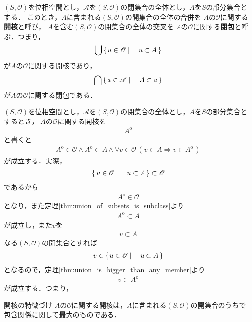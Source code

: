 	\begin{screen}
		\begin{dfn}[開核・閉包]
			$(S,\mathscr{O})$を位相空間とし，$\mathscr{A}$を$(S,\mathscr{O})$の閉集合の全体とし，$A$を$S$の部分集合とする．
			このとき，$A$に含まれる$(S,\mathscr{O})$の開集合の全体の合併を
			$A$の$\mathscr{O}$に関する{\bf 開核}と呼び，
			$A$を含む$(S,\mathscr{O})$の閉集合の全体の交叉を
			$A$の$\mathscr{O}$に関する{\bf 閉包}と呼ぶ．つまり，
			\begin{align}
				\bigcup \left\{\, u \in \mathscr{O} \mid \quad u \subset A\, \right\}
			\end{align}
			が$A$の$\mathscr{O}$に関する開核であり，
			\begin{align}
				\bigcap \left\{\, a \in \mathscr{A} \mid \quad A \subset a\, \right\}
			\end{align}
			が$A$の$\mathscr{O}$に関する閉包である．
		\end{dfn}
	\end{screen}
	
	$(S,\mathscr{O})$を位相空間とし，$\mathscr{A}$を$(S,\mathscr{O})$の閉集合の全体とし，$A$を$S$の部分集合とするとき，
	$A$の$\mathscr{O}$に関する開核を
	\begin{align}
		A^{\mathrm{o}}
	\end{align}
	と書くと
	\begin{align}
		A^{\mathrm{o}} \in \mathscr{O} \wedge A^{\mathrm{o}} \subset A \wedge 
		\forall v \in \mathscr{O}\, \left(\, v \subset A \Longrightarrow v \subset A^{\mathrm{o}}\, \right)
		\label{fom:interior_is_the_largest_open_subset}
	\end{align}
	が成立する．実際，
	\begin{align}
		\left\{\, u \in \mathscr{O} \mid \quad u \subset A\, \right\} \subset \mathscr{O}
	\end{align}
	であるから
	\begin{align}
		A^{\mathrm{o}} \in \mathscr{O}
	\end{align}
	となり，また定理\ref{thm:union_of_subsets_is_subclass}より
	\begin{align}
		A^{\mathrm{o}} \subset A
	\end{align}
	が成立し，また$v$を
	\begin{align}
		v \subset A
	\end{align}
	なる$(S,\mathscr{O})$の開集合とすれば
	\begin{align}
		v \in \left\{\, u \in \mathscr{O} \mid \quad u \subset A\, \right\}
	\end{align}
	となるので，定理\ref{thm:union_is_bigger_than_any_member}より
	\begin{align}
		v \subset A^{\mathrm{o}}
	\end{align}
	が成立する．つまり，
	\begin{itembox}[l]{開核の特徴づけ}
		$A$の$\mathscr{O}$に関する開核は，$A$に含まれる$(S,\mathscr{O})$の開集合のうちで包含関係に関して最大のものである．
	\end{itembox}
	
